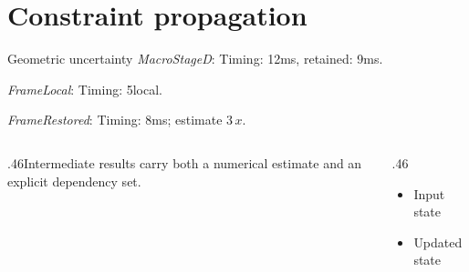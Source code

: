 \documentclass[9pt,aspectratio=43]{beamer}
\newcommand{\fuzzlayerA}[1]{\textit{#1}}
\newcommand{\fuzzlayerB}[1]{\fuzzlayerA{#1}}
\newcommand{\fuzzterm}[1]{\fuzzlayerB{#1}}
\newcommand{\fuzzpair}[2]{\fuzzterm{#1}: #2}
\newcommand{\fuzzunit}{ms}
\let\fuzzoriginalunit\fuzzunit
\newcommand{\fuzzcoefficient}{3}
\newcommand{\fuzzscale}[2][\fuzzcoefficient]{#1\,#2}
\begin{document}
\section{Constraint propagation}
\begin{frame}[t]{Geometric uncertainty}
\fuzzpair{MacroStageD}{Timing: 12\fuzzunit, retained: 9\fuzzoriginalunit.}\par
{\renewcommand{\fuzzunit}{local}\fuzzpair{FrameLocal}{Timing: 5\fuzzunit.}\par}
\fuzzpair{FrameRestored}{Timing: 8\fuzzunit; estimate $\fuzzscale{x}$.}\par
\begin{columns}[T]\begin{column}{.46\textwidth}Intermediate results carry both a numerical estimate and an explicit dependency set.\end{column}\begin{column}{.46\textwidth}\begin{itemize}\item Input state\item Updated state\end{itemize}\end{column}\end{columns}
\end{frame}
\end{document}

